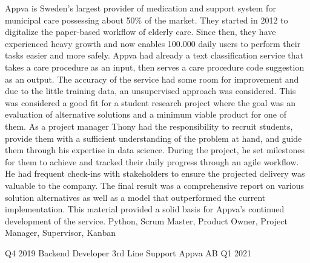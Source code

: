 \begin{experiences}
{        Appva is Sweden’s largest provider of medication and support system for municipal care possessing about 50\% of the market.
        They started in 2012 to digitalize the paper-based workflow of elderly care.
        Since then, they have experienced heavy growth and now enables 100.000 daily users to perform their tasks easier and more safely.
        \newline \newline
        Appva had already a text classification service that takes a care procedure as an input, then serves a care procedure code suggestion as an output.
        The accuracy of the service had some room for improvement and due to the little training data, an unsupervised approach was considered.
        This was considered a good fit for a student research project where the goal was an evaluation of alternative solutions and a minimum viable product for one of them.
        \newline \newline
        As a project manager Thony had the responsibility to recruit students, provide them with a sufficient understanding of the problem at hand, and guide them through his expertise in data science.
        During the project, he set milestones for them to achieve and tracked their daily progress through an agile workflow.
        He had frequent check-ins with stakeholders to ensure the projected delivery was valuable to the company.
        The final result was a comprehensive report on various solution alternatives as well as a model that outperformed the current implementation.
        This material provided a solid basis for Appva's continued development of the service.
        \newline
    }
    {Python, Scrum Master, Product Owner, Project Manager, Supervisor, Kanban}
    \emptySeparator   
    
    \experience
    {Q4 2019}   
    {Backend Developer}
    {3rd Line Support}
    {Appva AB}
    {Q1 2021} {
    
}
\end{experiences}
